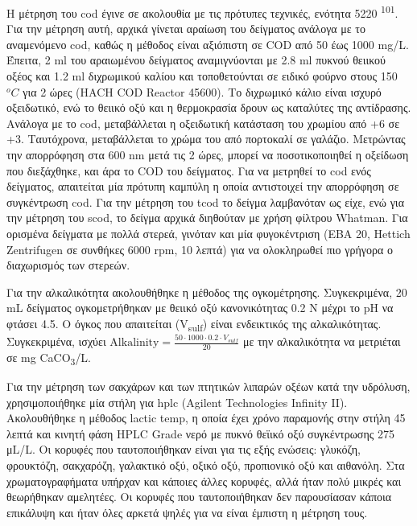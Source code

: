 \documentclass[11pt]{report}
\makeatletter
\newcommand{\citeprocitem}[2]{\hyper@linkstart{cite}{citeproc_bib_item_#1}#2\hyper@linkend}
\makeatother
\begin{document}
Η μέτρηση του \acrshort{cod} έγινε σε ακολουθία με τις πρότυπες τεχνικές, ενότητα 5220 \textsuperscript{\citeprocitem{101}{101}}. Για την μέτρηση αυτή, αρχικά γίνεται αραίωση του δείγματος ανάλογα με το αναμενόμενο \acrshort{cod}, καθώς η μέθοδος είναι αξιόπιστη σε COD από 50 έως 1000 mg/L. Έπειτα, 2 ml του αραιωμένου δείγματος αναμιγνύονται με 2.8 ml πυκνού θειικού οξέος και 1.2 ml διχρωμικού καλίου και τοποθετούνται σε ειδικό φούρνο στους 150 \(^oC\) για 2 ώρες (HACH COD Reactor 45600). Το διχρωμικό κάλιο είναι ισχυρό οξειδωτικό, ενώ το θειικό οξύ και η θερμοκρασία δρουν ως καταλύτες της αντίδρασης. Ανάλογα με το \acrshort{cod}, μεταβάλλεται η οξειδωτική κατάσταση του χρωμίου από +6 σε +3. Ταυτόχρονα, μεταβάλλεται το χρώμα του από πορτοκαλί σε γαλάζιο. Μετρώντας την απορρόφηση στα 600 nm μετά τις 2 ώρες, μπορεί να ποσοτικοποιηθεί η οξείδωση που διεξάχθηκε, και άρα το COD του δείγματος. Για να μετρηθεί το \acrshort{cod} ενός δείγματος, απαιτείται μία πρότυπη καμπύλη η οποία αντιστοιχεί την απορρόφηση σε συγκέντρωση \acrshort{cod}. Για την μέτρηση του \acrshort{tcod} το δείγμα λαμβανόταν ως είχε, ενώ για την μέτρηση του \acrshort{scod}, το δείγμα αρχικά διηθούταν με χρήση φίλτρου Whatman. Για ορισμένα δείγματα με πολλά στερεά, γινόταν και μία φυγοκέντριση (EBA 20, Hettich Zentrifugen σε συνθήκες 6000 rpm, 10 λεπτά) για να ολοκληρωθεί πιο γρήγορα ο διαχωρισμός των στερεών.

Για την αλκαλικότητα ακολουθήθηκε η μέθοδος της ογκομέτρησης. Συγκεκριμένα, 20 mL δείγματος ογκομετρήθηκαν με θειικό οξύ κανονικότητας 0.2 Ν μέχρι το pH να φτάσει 4.5. Ο όγκος που απαιτείται (V\textsubscript{sulf}) είναι ενδεικτικός της αλκαλικότητας. Συγκεκριμένα, ισχύει \(\text{Alkalinity} = \frac{50 \cdot 1000 \cdot 0.2 \cdot V_{sulf}}{20}\) με την αλκαλικότητα να μετριέται σε mg CaCO\textsubscript{3}/L.  

Για την μέτρηση των σακχάρων και των πτητικών λιπαρών οξέων κατά την υδρόλυση, χρησιμοποιήθηκε μία στήλη για \acrfull{hplc} (Agilent Technologies Infinity II). Ακολουθήθηκε η μέθοδος lactic temp, η οποία έχει χρόνο παραμονής στην στήλη 45 λεπτά και κινητή φάση HPLC Grade νερό με πυκνό θεϊικό οξύ συγκέντρωσης 275 μL/L. Οι κορυφές που ταυτοποιήθηκαν είναι για τις εξής ενώσεις: γλυκόζη, φρουκτόζη, σακχαρόζη, γαλακτικό οξύ, οξικό οξύ, προπιονικό οξύ και αιθανόλη. Στα χρωματογραφήματα υπήρχαν και κάποιες άλλες κορυφές, αλλά ήταν πολύ μικρές και θεωρήθηκαν αμελητέες. Οι κορυφές που ταυτοποιήθηκαν δεν παρουσίασαν κάποια επικάλυψη και ήταν όλες αρκετά ψηλές για να είναι έμπιστη η μέτρηση τους.
\end{document}
